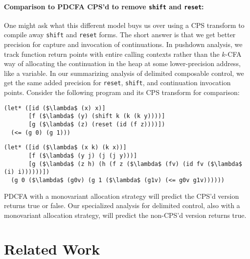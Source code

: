 \paragraph{Comparison to PDCFA CPS'd to remove {\tt shift} and {\tt reset}:}{
  One might ask what this different model buys us over using a CPS transform to compile away {\tt shift} and {\tt reset} forms.
%
The short answer is that we get better precision for capture and invocation of continuations.
%
In pushdown analysis, we track function return points with entire calling contexts rather than the $k$-CFA way of allocating the continuation in the heap at some lower-precision address, like a variable.
%
In our summarizing analysis of delimited composable control, we get the same added precision for {\tt reset}, {\tt shift}, and continuation invocation points.
%
Consider the following program and its CPS transform for comparison:
\begin{lstlisting}[mathescape]
(let* ([id ($\lambda$ (x) x)]
       [f ($\lambda$ (y) (shift k (k (k y))))]
       [g ($\lambda$ (z) (reset (id (f z))))])
  (<= (g 0) (g 1)))
\end{lstlisting}

\begin{lstlisting}[mathescape]
(let* ([id ($\lambda$ (x k) (k x))]
       [f ($\lambda$ (y j) (j (j y)))]
       [g ($\lambda$ (z h) (h (f z ($\lambda$ (fv) (id fv ($\lambda$ (i) i))))))])
  (g 0 ($\lambda$ (g0v) (g 1 ($\lambda$ (g1v) (<= g0v g1v))))))
\end{lstlisting}

PDCFA with a monovariant allocation strategy will predict the CPS'd version returns true or false.
%
Our specialized analysis for delimited control, also with a monovariant allocation strategy, will predict the non-CPS'd version returns true.}

\section{Related Work}

